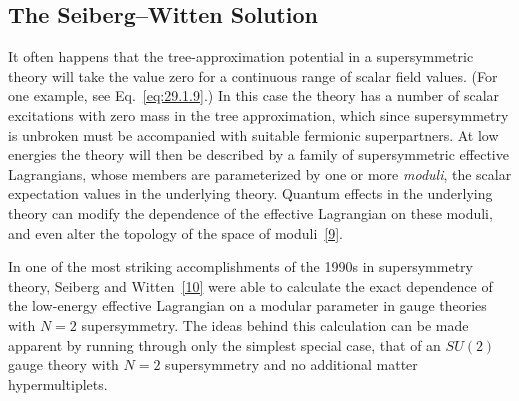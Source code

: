 
\subsection[The Seiberg--Witten Solution]{The Seiberg--Witten
Solution\footnotemark}

It often happens that the tree-approximation potential in a supersymmetric
theory will take the value zero for a continuous range of scalar field
values. (For one example, see Eq.~\eqref{eq:29.1.9}.) In this case the theory
has a number of scalar excitations with zero mass in the tree approximation,
which since supersymmetry is unbroken must be accompanied with suitable
fermionic superpartners. At low energies the theory will then be described by
a family of supersymmetric effective Lagrangians, whose members are
parameterized by one or more \textit{moduli}, the scalar expectation values
in the underlying theory. Quantum effects in the underlying theory can
modify the dependence of the effective Lagrangian on these moduli, and even
alter the topology of the space of moduli~\hyperref[ch29-ref-9]{[9]}.

In one of the most striking accomplishments of the 1990s in supersymmetry
theory, Seiberg and Witten~\hyperref[ch29-ref-10]{[10]} were able to
calculate the exact dependence of the low-energy effective Lagrangian on a
modular parameter in gauge theories with \(N=2\) supersymmetry. The ideas
behind this calculation can be made apparent by running through only the
simplest special case, that of an \(SU(2)\) gauge theory with \(N=2\)
supersymmetry and no additional matter hypermultiplets.

